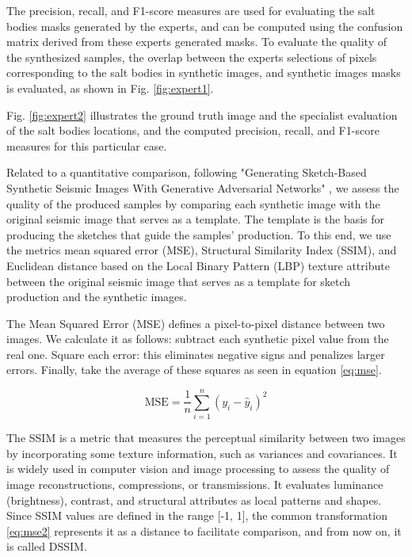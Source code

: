 \documentclass{ieeeaccess}
\begin{document}
The precision, recall, and F1-score measures are used for evaluating the salt bodies masks generated by the experts, and can be computed using the confusion matrix derived from these experts generated masks. To evaluate the quality of the synthesized samples, the overlap between the experts selections of pixels corresponding to the salt bodies in synthetic images, and synthetic images masks is evaluated, as shown in Fig. \ref{fig:expert1}.

Fig. \ref{fig:expert2} illustrates the ground truth image and the specialist evaluation of the salt bodies locations, and the computed precision, recall, and F1-score measures for this particular case.

Related to a quantitative comparison, following "Generating Sketch-Based Synthetic Seismic Images With Generative Adversarial Networks" \cite{ref19}, we assess the quality of the produced samples by comparing each synthetic image with the original seismic image that serves as a template. The template is the basis for producing the sketches that guide the samples' production. To this end, we use the metrics mean squared error (MSE), Structural Similarity Index (SSIM), and Euclidean distance based on the Local Binary Pattern (LBP) texture attribute between the original seismic image that serves as a template for sketch production and the synthetic images.

The Mean Squared Error (MSE) defines a pixel-to-pixel distance between two images. We calculate it as follows: subtract each synthetic pixel value from the real one. Square each error: this eliminates negative signs and penalizes larger errors. Finally, take the average of these squares as seen in equation \ref{eq:mse}.

\begin{equation}
\label{eq:mse}
\text{MSE} = \frac{1}{n} \sum_{i=1}^{n} (y_i - \hat{y}_i)^2
\end{equation}

The SSIM is a metric that measures the perceptual similarity between two images by incorporating some texture information, such as variances and covariances. It is widely used in computer vision and image processing to assess the quality of image reconstructions, compressions, or transmissions. It evaluates luminance (brightness), contrast, and structural attributes as local patterns and shapes. Since SSIM values are defined in the range [-1, 1], the common transformation \ref{eq:mse2} represents it as a distance to facilitate comparison, and from now on, it is called DSSIM.
\end{document}
